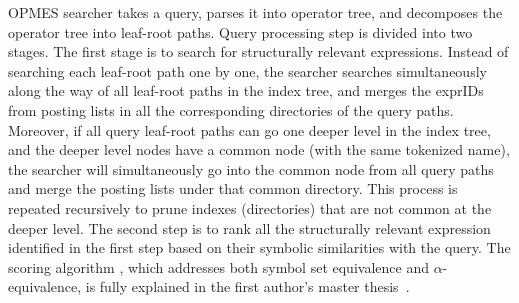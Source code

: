\documentclass{llncs}
\begin{document}
OPMES searcher takes a query, parses it into operator tree, and decomposes the operator tree into leaf-root paths.
Query processing step is divided into two stages.  The first stage is to search for structurally relevant expressions. 
Instead of searching each leaf-root path one by one, the searcher searches simultaneously along the way of all leaf-root paths in the index tree, and merges the exprIDs from posting lists in all the corresponding directories of the query paths.
Moreover, if all query leaf-root paths can go one deeper level in the index tree, and the deeper level nodes have a common node (with the same tokenized name), the searcher will simultaneously go into the common node from all query paths and merge the posting lists under that common directory.  This process is repeated recursively to prune indexes (directories) that are not common at the deeper level.
The second step is to rank all the structurally relevant expression identified in the first step 
based on their symbolic similarities with the query.  
The scoring algorithm , 
which addresses both symbol set equivalence and $\alpha$-equivalence, is fully explained in 
the first author's master thesis~\cite{mythesis}.
\end{document}
